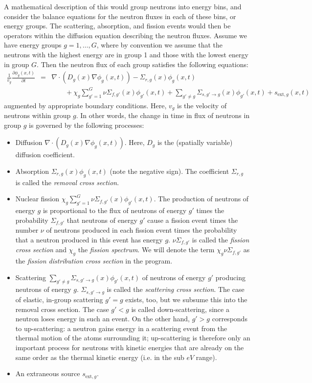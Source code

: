 \documentclass{article}
\begin{document}
A mathematical description of this would group neutrons into energy bins, and
consider the balance equations for the neutron fluxes in each of these
bins, or energy groups. The scattering, absorption, and fission events would
then be operators within the diffusion equation describing the neutron
fluxes. Assume we have energy groups $g=1,\ldots,G$, where by convention we
assume that the neutrons with the highest energy are in group 1 and those with
the lowest energy in group $G$. Then the neutron flux of each group satisfies the
following equations:
\begin{eqnarray*}
\frac 1{v_g}\frac{\partial \phi_g(x,t)}{\partial t}
&=&
\nabla \cdot(D_g(x) \nabla \phi_g(x,t))
-
\Sigma_{r,g}(x)\phi_g(x,t)
\\
&& \qquad
+
\chi_g\sum_{g'=1}^G\nu\Sigma_{f,g'}(x)\phi_{g'}(x,t)
+
\sum_{g'\ne g}\Sigma_{s,g'\to g}(x)\phi_{g'}(x,t)
+
s_{\mathrm{ext},g}(x,t)
\end{eqnarray*}
augmented by appropriate boundary conditions. Here, $v_g$ is the velocity of
neutrons within group $g$. In other words, the change in
time in flux of neutrons in group $g$ is governed by the following
processes:
\begin{itemize}
\item Diffusion $\nabla \cdot(D_g(x) \nabla \phi_g(x,t))$. Here, $D_g$ is the
  (spatially variable) diffusion coefficient. 
\item Absorption $\Sigma_{r,g}(x)\phi_g(x,t)$ (note the
  negative sign). The coefficient $\Sigma_{r,g}$ is called the \textit{removal
  cross section}.
\item Nuclear fission $\chi_g\sum_{g'=1}^G\nu\Sigma_{f,g'}(x)\phi_{g'}(x,t)$. 
  The production of neutrons of energy $g$ is
  proportional to the flux of neutrons of energy $g'$ times the
  probability $\Sigma_{f,g'}$ that neutrons of energy $g'$ cause a fission
  event times the number $\nu$ of neutrons produced in each fission event
  times the probability that a neutron produced in this event has energy
  $g$. $\nu\Sigma_{f,g'}$ is called the \textit{fission cross section} and
  $\chi_g$ the \textit{fission spectrum}. We will denote the term
  $\chi_g\nu\Sigma_{f,g'}$ as the \textit{fission distribution cross
    section} in the program.
\item Scattering $\sum_{g'\ne g}\Sigma_{s,g'\to g}(x)\phi_{g'}(x,t)$ 
  of neutrons of energy $g'$ producing neutrons
  of energy $g$. $\Sigma_{s,g'\to g}$ is called the \textit{scattering cross
    section}. The case of elastic, in-group scattering $g'=g$ exists, too, but
  we subsume this into the removal cross section. The case $g'<g$ is called
  down-scattering, since a neutron loses energy in such an event. On the
  other hand, $g'>g$ corresponds to up-scattering: a neutron gains energy in
  a scattering event from the thermal motion of the atoms surrounding it;
  up-scattering is therefore only an important process for neutrons with
  kinetic energies that are already on the same order as the thermal kinetic
  energy (i.e. in the sub $eV$ range).
\item An extraneous source $s_{\mathrm{ext},g}$.
\end{itemize}
\end{document}
